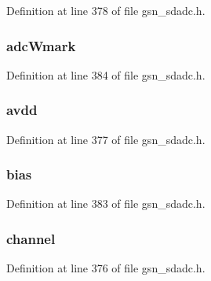 Definition at line 378 of file gsn\_\-sdadc.h.

\hypertarget{a00213_a43e7060c1e6d911594dfefb04bbeeb87}{
\subsubsection[{adcWmark}]{ {\bf adcWmark}}}
\label{a00213_a43e7060c1e6d911594dfefb04bbeeb87}


Definition at line 384 of file gsn\_\-sdadc.h.

\hypertarget{a00213_a68990146d77efa0a03f6389e13f8c17d}{
\subsubsection[{avdd}]{ {\bf avdd}}}
\label{a00213_a68990146d77efa0a03f6389e13f8c17d}


Definition at line 377 of file gsn\_\-sdadc.h.

\hypertarget{a00213_a79b233a1b97d14e0d4bd3827cf9f352a}{
\subsubsection[{bias}]{ {\bf bias}}}
\label{a00213_a79b233a1b97d14e0d4bd3827cf9f352a}


Definition at line 383 of file gsn\_\-sdadc.h.

\hypertarget{a00213_a638b26520e830eef1ebe306f07682c83}{
\subsubsection[{channel}]{ {\bf channel}}}
\label{a00213_a638b26520e830eef1ebe306f07682c83}


Definition at line 376 of file gsn\_\-sdadc.h.

